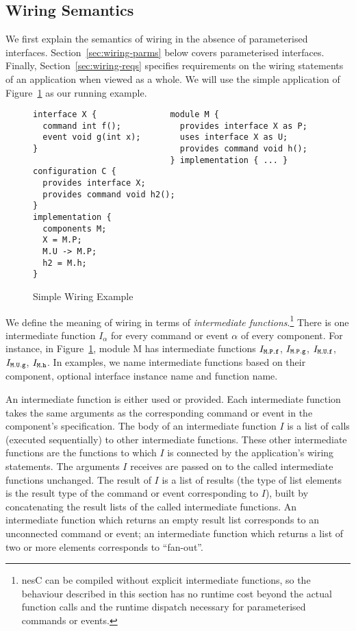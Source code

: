 \documentclass[11pt,letterpaper]{article}
\newcommand{\code}[1]{{\tt #1}}
\newcommand{\nesc}{nesC\xspace}
\begin{document}
\subsection{Wiring Semantics}
\label{sec:wiring-semantics}

We first explain the semantics of wiring in the absence of parameterised
interfaces. Section~\ref{sec:wiring-parms} below covers parameterised
interfaces. Finally, Section~\ref{sec:wiring-reqs} specifies requirements
on the wiring statements of an application when viewed as a whole. We will
use the simple application of Figure~\ref{fig:wiring} as our running
example.

\begin{figure}
\begin{verbatim}
interface X {               module M {
  command int f();            provides interface X as P;
  event void g(int x);        uses interface X as U;
}                             provides command void h();
                            } implementation { ... }
configuration C {
  provides interface X;
  provides command void h2();
}
implementation {
  components M;
  X = M.P;
  M.U -> M.P;
  h2 = M.h;
}  
\end{verbatim}
\caption{Simple Wiring Example}
\label{fig:wiring}
\end{figure}

We define the meaning of wiring in terms of \emph{intermediate
functions}.\footnote{\nesc can be compiled without explicit intermediate
functions, so the behaviour described in this section has no runtime cost
beyond the actual function calls and the runtime dispatch necessary for
parameterised commands or events.}  There is one intermediate function
$I_\alpha$ for every command or event $\alpha$ of every component. For
instance, in Figure~\ref{fig:wiring}, module M has intermediate functions
$I_\code{M.P.f}$, $I_\code{M.P.g}$, $I_\code{M.U.f}$, $I_\code{M.U.g}$,
$I_\code{M.h}$.  In examples, we name intermediate functions based on their
component, optional interface instance name and function name.

An intermediate function is either used or provided. Each intermediate
function takes the same arguments as the corresponding command or event in
the component's specification. The body of an intermediate function $I$ is
a list of calls (executed sequentially) to other intermediate
functions. These other intermediate functions are the functions to which
$I$ is connected by the application's wiring statements. The arguments $I$
receives are passed on to the called intermediate functions unchanged. The
result of $I$ is a list of results (the type of list elements is the result
type of the command or event corresponding to $I$), built by concatenating
the result lists of the called intermediate functions. An intermediate
function which returns an empty result list corresponds to an unconnected
command or event; an intermediate function which returns a list of two or
more elements corresponds to ``fan-out''.
\end{document}
